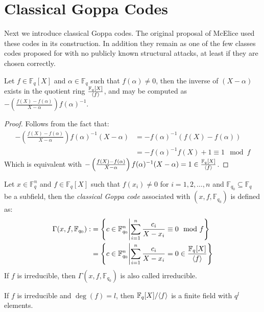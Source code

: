 \chapter{Classical Goppa Codes}\label{chap:classical_goppa}
Next we introduce classical Goppa codes. The original proposal of McElice used these codes in its construction. In addition they remain as one of the few classes codes proposed for with no publicly known structural attacks, at least if they are chosen correctly.

\begin{theorem}\label{thm:inverse}
  Let $f \in \mathbb{F}_q[X]$ and $\alpha \in \mathbb{F}_q$ such that $f(\alpha) \neq 0$, then the inverse of $(X - \alpha)$ exists in the quotient ring $\frac{\mathbb{F}_{q}[X]}{\langle f\rangle}$, and may be computed as $-\left(\frac{f(X) - f(\alpha)}{X - \alpha}\right)f(\alpha)^{-1}$.
\end{theorem}

\begin{proof}
  Follows from the fact that:
  \begin{align*}
-\left(\frac{f(X) - f(\alpha)}{X - \alpha}\right)f(\alpha)^{-1}(X - \alpha) &= - f(\alpha)^{-1} (f(X) - f(\alpha)) \\ &= -f(\alpha)^{-1} f(X) + 1 \equiv 1 \mod f
  \end{align*}
  Which is equivalent with $-\left(\frac{f(X) - f(\alpha)}{X - \alpha}\right)f(\alpha)^{-1}(X - \alpha) = 1 \in \frac{\mathbb{F}_{q}[X]}{\langle f\rangle}$.
\end{proof}

\begin{definition}\label{def:classical}
  Let $x \in \mathbb{F}_q^n$ and $f \in \mathbb{F}_q[X]$ such that $f(x_i) \neq 0$ for $i = 1, 2, \ldots, n$ and $\mathbb{F}_{q_0} \subseteq \mathbb{F}_q$ be a subfield, then the \textit{classical Goppa code} associated with $(x, f, \mathbb{F}_{q_0})$ is defined as:
  \begin{align*}
    \Gamma(x, f, \mathbb{F}_{q_0}) :&= \left\{c \in \mathbb{F}^n_{q_0} \middle| \sum^n_{i = 1} \frac{c_{i}}{X - x_{i}} \equiv 0 \mod f\right\}
     \\&= \left\{c \in \mathbb{F}^n_{q_0} \middle| \sum^n_{i = 1} \frac{c_{i}}{X - x_{i}} = 0 \in \frac{\mathbb{F}_q[X]}{\langle f\rangle}\right\}
  \end{align*}
  If $f$ is irreducible, then $\Gamma(x, f, \mathbb{F}_{q_0})$ is also called irreducible.
\end{definition}
\begin{remark}
  If $f$ is irreducible and $\deg(f) = l$, then $\mathbb{F}_{q}[X] / \langle f\rangle$ is a finite field with $q^l$ elements.
\end{remark}

